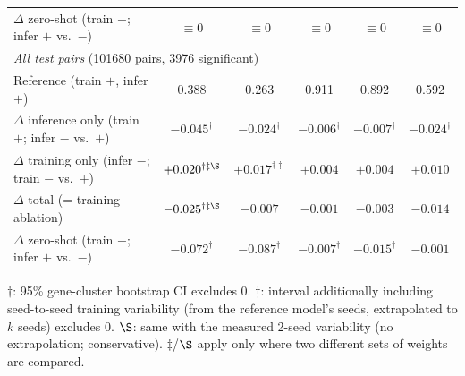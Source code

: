 \begin{table}[t]
{\begin{tabular}{lccccc}
\quad $\Delta$ zero-shot (train $-$; infer $+$ vs.\ $-$) & $\equiv 0$ & $\equiv 0$ & $\equiv 0$ & $\equiv 0$ & $\equiv 0$ \\
\multicolumn{6}{l}{\textit{All test pairs} (101680 pairs, 3976 significant)} \\
\quad Reference (train $+$, infer $+$) & 0.388 & 0.263 & 0.911 & 0.892 & 0.592 \\
\quad $\Delta$ inference only (train $+$; infer $-$ vs.\ $+$) & $-0.045^{\dagger}$ & $-0.024^{\dagger}$ & $-0.006^{\dagger}$ & $-0.007^{\dagger}$ & $-0.024^{\dagger}$ \\
\quad $\Delta$ training only (infer $-$; train $-$ vs.\ $+$) & $+0.020^{\dagger\ddagger\S}$ & $+0.017^{\dagger\ddagger}$ & $+0.004$ & $+0.004$ & $+0.010$ \\
\quad $\Delta$ total (= training ablation) & $-0.025^{\dagger\ddagger\S}$ & $-0.007$ & $-0.001$ & $-0.003$ & $-0.014$ \\
\quad $\Delta$ zero-shot (train $-$; infer $+$ vs.\ $-$) & $-0.072^{\dagger}$ & $-0.087^{\dagger}$ & $-0.007^{\dagger}$ & $-0.015^{\dagger}$ & $-0.001$ \\
\bottomrule
\end{tabular}}
\par\smallskip\parbox{0.97\linewidth}{\scriptsize $\dagger$: 95\% gene-cluster bootstrap CI excludes 0. $\ddagger$: interval additionally including seed-to-seed training variability (from the reference model's seeds, extrapolated to $k$ seeds) excludes 0. $\S$: same with the measured 2-seed variability (no extrapolation; conservative). $\ddagger$/$\S$ apply only where two different sets of weights are compared.}
\end{table}


